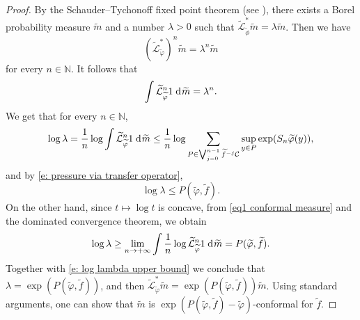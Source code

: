 \documentclass[12pt]{amsart}
\numberwithin{equation}{section} %
\numberwithin{figure}{section} %
\theoremstyle{plain}
\theoremstyle{definition}
\theoremstyle{remark}
\theoremstyle{citing}
\newcommand{\N}{\mathbb{N}}
\renewcommand{\=}{\coloneqq}
\newcommand{\dd}{\hspace{1pt}\operatorname{d}\hspace{-1pt}}
\begin{document}
\begin{proof}
By the Schauder--Tychonoff fixed point theorem (see \cite[p. 456]{DunfordSchwartz}), there exists a Borel probability measure $\widetilde m$ and a number $\lambda>0$ such that $\widetilde{\mathcal{L}}_{\widetilde\phi}^{*}\widetilde m=\lambda\widetilde m$. Then we have
     \begin{equation*}
         (\widetilde{\mathcal{L}}_{\widetilde{\varphi}}^*)^n \widetilde{m} = \lambda^n \widetilde{m}
     \end{equation*}
     for every $n\in\N$. It follows that
     \begin{equation}\label{eq1 conformal measure}
         \int \widetilde{\mathcal{L}}_{\widetilde{\varphi}}^n 1 \dd \widetilde{m} = \lambda^n.
     \end{equation}
     We get that for every $n\in \N$,
    \begin{equation*}
        \log \lambda =  \frac{1}{n}\log \int \widetilde{\mathcal{L}}_{\widetilde{\varphi}}^n 1 \dd\widetilde{m} \leq  \frac{1}{n}\log\sum_{P\in \bigvee_{j=0}^{n-1}\widetilde{f}^{-j}\mathcal C} \sup_{y\in P} \exp(S_n\widetilde{\varphi}(y)),
    \end{equation*}
   and by \eqref{e: pressure via transfer operator},
\begin{equation}\label{e: log lambda upper bound}
    \log\lambda \leq P(\widetilde{\varphi}, \widetilde{f}).
\end{equation}
    On the other hand, since $t\mapsto \log t$ is concave, from \eqref{eq1 conformal measure} and the dominated convergence theorem, we obtain
    \begin{equation*}
        \log \lambda \geq \lim_{n\to+\infty}\int \frac{1}{n} \log \widetilde{\mathcal{L}}_{\widetilde{\varphi}}^n 1 \dd \widetilde{m} = P(\widetilde{\varphi},\widetilde{f}).
    \end{equation*}
    Together with \eqref{e: log lambda upper bound} we conclude that $\lambda = \exp(P(\widetilde\varphi,\widetilde{f}))$, and then $\widetilde{\mathcal{L}}_{\widetilde\varphi}^* \widetilde{m} = \exp(P(\widetilde\varphi,\widetilde{f}))\widetilde{m}$. Using standard arguments, one can show that $\widetilde{m}$ is $\exp(P(\widetilde\varphi,\widetilde{f})-\widetilde\varphi)$-conformal for $\widetilde{f}$.
      \end{proof}
\end{document}
